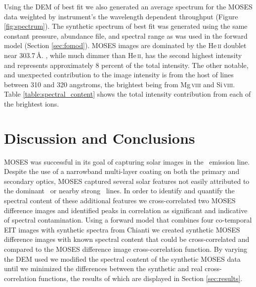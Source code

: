 	
	Using the DEM of best fit we also generated an average spectrum for the MOSES data weighted by instrument's the wavelength dependent throughput (Figure \ref{fig:spectrum}).
	The synthetic spectrum of best fit was generated using the same constant pressure, abundance file, and spectral range as was used in the forward model (Section \ref{sec:fomod}).
	MOSES images are dominated by the He\,\textsc{ii} doublet near 303.7\,\AA.
	\sixi, while much dimmer than He\,\textsc{ii}, has the second highest intensity and represents approximately 8 percent of the total intensity.
	The other notable, and unexpected contribution to the image intensity is from the host of lines between 310 and 320 angstroms, the brightest being from Mg\,\textsc{viii} and Si\,\textsc{viii}.
	Table \ref{table:spectral_content} shows the total intensity contribution from each of the brightest ions.  
	

	
\section{Discussion and Conclusions}\label{sec:conclusion}

	MOSES was successful in its goal of capturing solar images in the \heii \ emission line.
	Despite the use of a narrowband multi-layer coating on both the primary and secondary optics, MOSES captured several solar features not easily attributed to the dominant \heii \ or nearby strong \sixi \ lines.
	In order to identify and quantify the spectral content of these additional features we cross-correlated two MOSES difference images and identified peaks in correlation as significant and indicative of spectral contamination.
	Using a forward model that combines four co-temporal EIT images with synthetic spectra from Chianti we created synthetic MOSES difference images with known spectral content that could be cross-correlated and compared to the MOSES difference image cross-correlation function.
	By varying the DEM used we modified the spectral content of the synthetic MOSES data until we minimized the differences between the synthetic and real cross-correlation functions, the results of which are displayed in Section \ref{sec:results}.
	
